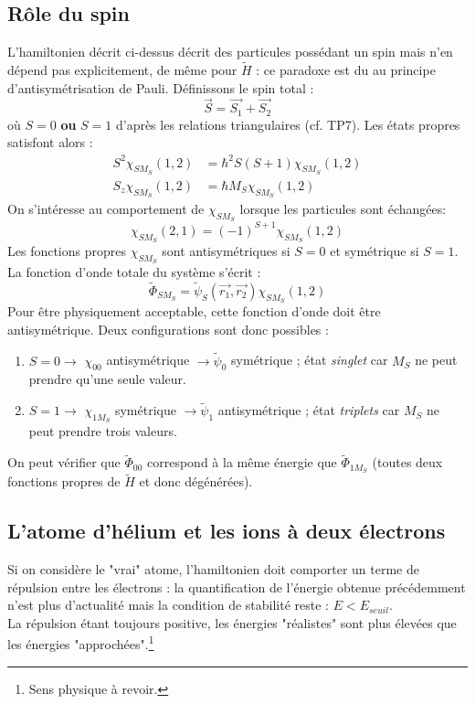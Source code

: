 \documentclass	[11pt, a4paper, openany]{book}
\begin{document}
	\subsection{Rôle du spin}
	L'hamiltonien décrit ci-dessus décrit des particules possédant un spin mais n'en 
	dépend pas explicitement, de même pour $\tilde{H}$ : ce paradoxe est du au principe
	d'antisymétrisation de Pauli. Définissons le spin total :
	\begin{equation}
		\vec{S}=\vec{S_1}+\vec{S_2}
	\end{equation}
	où $S=0$ \textbf{ou} $S=1$ d'après les relations triangulaires (cf. TP7). Les états 
	propres satisfont alors :
	\begin{equation}
		\begin{array}{ll}
			S^2\chi_{SM_S}(1,2) & = \hbar^2S(S+1)\chi_{SM_S}(1,2) \\
			S_z\chi_{SM_S}(1,2) & = \hbar M_S\chi_{SM_S}(1,2)     
		\end{array}
	\end{equation}
	On s'intéresse au comportement de $\chi_{SM_S}$ lorsque les particules sont échangées:
	\begin{equation}
		\chi_{SM_S}(2,1) = (-1)^{S+1}\chi_{SM_S}(1,2)
	\end{equation}
	Les fonctions propres $\chi_{SM_S}$ sont antisymétriques si $S=0$ et symétrique si 
	$S=1$. La fonction d'onde totale du système s'écrit :
	\begin{equation}
		\tilde{\Phi}_{SM_S} = \tilde{\psi}_S(\vec{r_1},\vec{r_2})\chi_{SM_S}(1,2)
	\end{equation}
	Pour \^etre physiquement acceptable, cette fonction d'onde doit \^etre antisymétrique.
	Deux configurations sont donc possibles :
	\begin{enumerate}
		\item $S=0 \rightarrow$ $\chi_{00}$ antisymétrique $\rightarrow \tilde{\psi}_0$ 
		      symétrique ; état \textit{singlet} car $M_S$ ne peut prendre qu'une seule valeur.
		\item $S=1 \rightarrow$ $\chi_{1M_S}$ symétrique $\rightarrow \tilde{\psi}_1$ 
		      antisymétrique ; état \textit{triplets} car $M_S$ ne peut prendre trois valeurs.
	\end{enumerate}
	On peut vérifier que $\tilde{\Phi}_{00}$ correspond à la même énergie que $\tilde{
		\Phi}_{1M_S}$ (toutes deux fonctions propres de $\tilde{H}$ et donc dégénérées).
		
		
	\subsection{L'atome d'hélium et les ions à deux électrons}
	Si on considère le "vrai" atome, l'hamiltonien doit comporter un terme de répulsion 
	entre les électrons : la quantification de l'énergie obtenue précédemment n'est plus
	d'actualité mais la condition de stabilité reste : $E<E_{seuil}$.\\
	La répulsion étant toujours positive, les énergies "réalistes" sont plus élevées que 
	les énergies "approchées".\footnote{Sens physique à revoir.}
		
\end{document}

